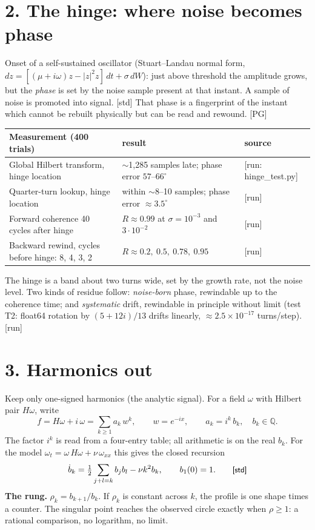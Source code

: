 \documentclass[11pt,a4paper]{article}
\newcommand{\stamp}[1]{\textsf{\small[#1]}}
\begin{document}
\section*{2. The hinge: where noise becomes phase}
Onset of a self-sustained oscillator (Stuart--Landau normal form, $dz=[(\mu+i\omega)z-|z|^2z]\,dt+\sigma\,dW$): just above threshold the amplitude grows, but the \emph{phase} is set by the noise sample present at that instant. A sample of noise is promoted into signal. \stamp{std} That phase is a fingerprint of the instant which cannot be rebuilt physically but can be read and rewound. \stamp{PG}

\begin{center}\small
\begin{tabular}{@{}lll@{}}\toprule
Measurement (400 trials) & result & source\\\midrule
Global Hilbert transform, hinge location & $\sim$1{,}285 samples late; phase error $57$--$66^\circ$ & \stamp{run: hinge\_test.py}\\
Quarter-turn lookup, hinge location & within $\sim$8--10 samples; phase error $\approx3.5^\circ$ & \stamp{run}\\
Forward coherence 40 cycles after hinge & $R\approx0.99$ at $\sigma=10^{-3}$ and $3\cdot10^{-2}$ & \stamp{run}\\
Backward rewind, cycles before hinge: 8, 4, 3, 2 & $R\approx0.2,\ 0.5,\ 0.78,\ 0.95$ & \stamp{run}\\\bottomrule
\end{tabular}
\end{center}
The hinge is a band about two turns wide, set by the growth rate, not the noise level. Two kinds of residue follow: \emph{noise-born} phase, rewindable up to the coherence time; and \emph{systematic} drift, rewindable in principle without limit (test T2: float64 rotation by $(5+12i)/13$ drifts linearly, $\approx2.5\times10^{-17}$ turns/step). \stamp{run}

\section*{3. Harmonics out}
Keep only one-signed harmonics (the analytic signal). For a field $\omega$ with Hilbert pair $H\omega$, write
\[
f=H\omega+i\,\omega=\sum_{k\ge1}a_k\,w^k,\qquad w=e^{-ix},\qquad a_k=i^k\,b_k,\quad b_k\in\mathbb Q .
\]
The factor $i^k$ is read from a four-entry table; all arithmetic is on the real $b_k$. For the model $\omega_t=\omega\,H\omega+\nu\,\omega_{xx}$ this gives the closed recursion
\[
\dot b_k=\tfrac12\sum_{j+l=k}b_j b_l-\nu k^2 b_k,\qquad b_1(0)=1 . \qquad\stamp{std}
\]
\textbf{The rung.} $\rho_k=b_{k+1}/b_k$. If $\rho_k$ is constant across $k$, the profile is one shape times a counter. The singular point reaches the observed circle exactly when $\rho\ge1$: a rational comparison, no logarithm, no limit.
\end{document}
